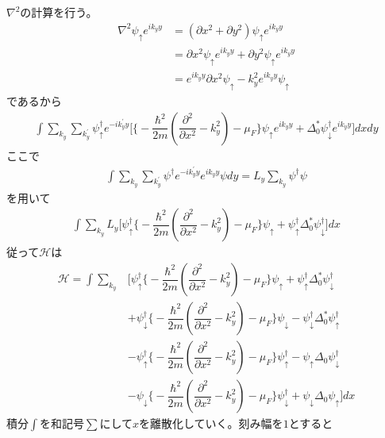 \documentclass{jarticle}
\begin{document}
$\nabla^2$の計算を行う。
\begin{align}
\nabla^{2}\psi_{\uparrow}e^{ik_yy}&=(\partial x^2+\partial y^2)\psi_{\uparrow}e^{ik_yy}\\
                                                      &=\partial x^2\psi_{\uparrow}e^{ik_yy}+\partial y^2\psi_{\uparrow}e^{ik_yy}\\
                                                    &=e^{ik_yy}\partial x^2\psi_{\uparrow}-k^{2}_ye^{ik_yy}\psi_{\uparrow}
\end{align}
であるから
\begin{align}
\int\displaystyle\sum_{k_y}\sum_{k_y^{'}}\psi_{\uparrow}^{\dagger}e^{-ik_y^{'}y}\Big[\big\{-\dfrac{\hbar^2}{2m}(\dfrac{\partial^{2}}{\partial x^2}-k^{2}_y)-\mu_F\big\}\psi_{\uparrow}e^{ik_yy}+\Delta^{*}_0\psi_{\downarrow}^{\dagger}e^{ik_yy}\Big]dxdy
\end{align}
ここで
\begin{align}
\int\displaystyle\sum_{k_y}\sum_{k_y^{'}}\psi^{\dagger}e^{-ik_y^{'}y}e^{ik_yy}{\psi}dy=L_y\sum_{k_y}\psi^{\dagger}\psi
\end{align}
を用いて
\begin{align}
\int\displaystyle\sum_{k_y}L_y\Big[\psi_{\uparrow}^{\dagger}\big\{-\dfrac{\hbar^2}{2m}(\dfrac{\partial^{2}}{\partial x^2}-k^{2}_y)-\mu_F\big\}\psi_{\uparrow}+\psi_{\uparrow}^{\dagger}\Delta^{*}_0\psi_{\downarrow}^{\dagger}\Big]dx
\end{align}
従って$\mathcal{H}$は
\begin{align}
\mathcal{H}=\int\displaystyle\sum_{k_y}&\Big[\psi_{\uparrow}^{\dagger}\big\{-\dfrac{\hbar^2}{2m}(\dfrac{\partial^{2}}{\partial x^2}-k^{2}_y)-\mu_F\big\}\psi_{\uparrow}+\psi_{\uparrow}^{\dagger}\Delta^{*}_0\psi_{\downarrow}^{\dagger}\\
&+\psi_{\downarrow}^{\dagger}\big\{-\dfrac{\hbar^2}{2m}(\dfrac{\partial^{2}}{\partial x^2}-k^{2}_y)-\mu_F\big\}\psi_{\downarrow}-\psi_{\downarrow}^{\dagger}\Delta^{*}_0\psi_{\uparrow}^{\dagger}\\
&-\psi_{\uparrow}^{\dagger}\big\{-\dfrac{\hbar^2}{2m}(\dfrac{\partial^{2}}{\partial x^2}-k^{2}_y)-\mu_F\big\}\psi_{\uparrow}^{\dagger}-\psi_{\uparrow}\Delta_0\psi_{\downarrow}^{\dagger}\\
&-\psi_{\downarrow}\big\{-\dfrac{\hbar^2}{2m}(\dfrac{\partial^{2}}{\partial x^2}-k^{2}_y)-\mu_F\big\}\psi_{\downarrow}^{\dagger}+\psi_{\downarrow}\Delta_0\psi_{\uparrow}\Big]dx
\end{align}
積分$\int$を和記号$\sum$にして$x$を離散化していく。刻み幅を$1$とすると
\end{document}
